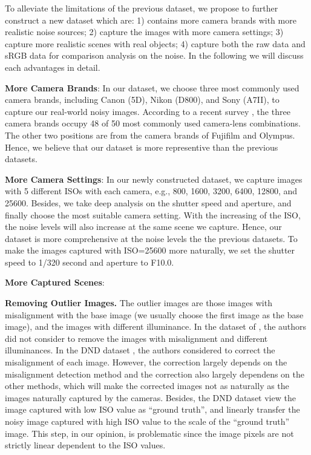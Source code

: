 To alleviate the limitations of the previous dataset, we propose to further construct a new dataset which are: 1) contains more camera brands with more realistic noise sources;  2) capture the images with more camera settings; 3) capture more realistic scenes with real objects; 4) capture both the raw data and sRGB data for comparison analysis on the noise. In the following we will discuss each advantages in detail.

\textbf{More Camera Brands}: In our dataset, we choose three most commonly used camera brands, including Canon (5D), Nikon (D800), and Sony (A7II), to capture our real-world noisy images. According to a recent survey \cite{commoncamera}, the three camera brands occupy 48 of 50 most commonly used camera-lens combinations. The other two positions are from the camera brands of Fujifilm and Olympus. Hence, we believe that our dataset is more representive than the previous datasets.

\textbf{More Camera Settings}: In our newly constructed dataset, we capture images with 5 different ISOs with each camera, e.g., 800, 1600, 3200, 6400, 12800, and 25600. Besides, we take deep analysis on the shutter speed and aperture, and finally choose the most suitable camera setting. With the increasing of the ISO, the noise levels will also increase at the same scene we capture. Hence, our dataset is more comprehensive at the noise levels the the previous datasets. To make the images captured with ISO=25600 more naturally, we set the shutter speed to 1/320 second and aperture to F10.0. 

\textbf{More Captured Scenes}: 



\textbf{Removing Outlier Images.} The outlier images are those images with misalignment with the base image (we usually choose the first image as the base image), and the images with different illuminance. In the dataset of \cite{crosschannel2016}, the authors did not consider to remove the images with misalignment and different illuminances. In the DND dataset \cite{dnd2017}, the authors considered to correct the misalignment of each image. However, the correction largely depends on the misalignment detection method and the correction also largely dependens on the other methods, which will make the corrected images not as naturally as the images naturally captured by the cameras. Besides, the DND dataset \cite{dnd2017} view the image captured with low ISO value as ``ground truth'', and linearly transfer the noisy image captured with high ISO value to the scale of the ``ground truth'' image. This step, in our opinion, is problematic since the image pixels are not strictly linear dependent to the ISO values. 
 
